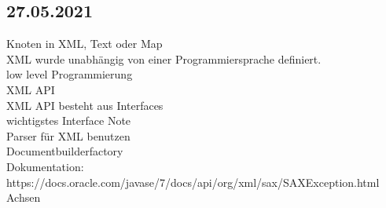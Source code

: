 \documentclass[paper=A4]{article}
\begin{document}
	\subsection*{27.05.2021}
	Knoten in XML, Text oder Map \\
	XML wurde unabhängig von einer Programmiersprache definiert. \\
	low level Programmierung \\
	XML API \\
	XML API besteht aus Interfaces \\
	wichtigstes Interface Note \\
	Parser für XML benutzen  \\
	Documentbuilderfactory \\
	Dokumentation: https://docs.oracle.com/javase/7/docs/api/org/xml/sax/SAXException.html \\
	Achsen \\
\end{document}
